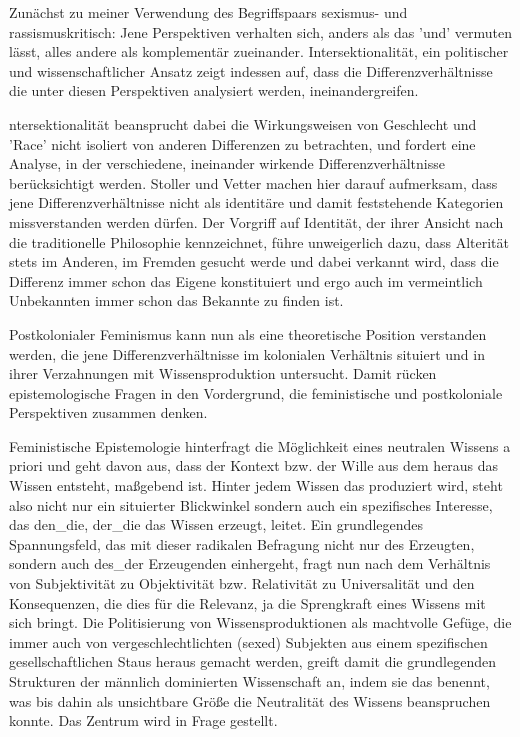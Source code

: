 Zunächst zu meiner Verwendung des Begriffspaars sexismus- und
rassismuskritisch: Jene Perspektiven verhalten sich, anders als das 'und'
vermuten lässt, alles andere als komplementär zueinander. Intersektionalität,
ein politischer und wissenschaftlicher Ansatz zeigt indessen auf, dass die
Differenzverhältnisse die unter diesen Perspektiven analysiert werden,
ineinandergreifen.

ntersektionalität beansprucht dabei die Wirkungsweisen von Geschlecht und
'Race' nicht isoliert von anderen Differenzen zu betrachten, und fordert eine
Analyse, in der verschiedene, ineinander wirkende Differenzverhältnisse
berücksichtigt werden. Stoller und Vetter machen hier darauf aufmerksam, dass
jene Differenzverhältnisse nicht als identitäre und damit feststehende
Kategorien missverstanden werden dürfen. Der Vorgriff auf Identität, der ihrer
Ansicht nach die traditionelle Philosophie kennzeichnet, führe unweigerlich
dazu, dass Alterität stets im Anderen, im Fremden gesucht werde und dabei
verkannt wird, dass die Differenz immer schon das Eigene konstituiert und ergo
auch im vermeintlich Unbekannten \glqq immer schon das Bekannte zu finden ist.\grqq
\footnotemark {}

Postkolonialer Feminismus kann nun als eine theoretische Position verstanden
werden, die jene Differenzverhältnisse im kolonialen Verhältnis situiert und in
ihrer Verzahnungen mit Wissensproduktion untersucht. Damit rücken
epistemologische Fragen in den Vordergrund, die feministische und postkoloniale
Perspektiven zusammen denken.

Feministische Epistemologie hinterfragt die Möglichkeit eines neutralen Wissens
a priori und geht davon aus, dass der Kontext bzw. der Wille aus dem heraus das
Wissen entsteht, maßgebend ist. Hinter jedem Wissen das produziert wird, steht
also nicht nur ein situierter Blickwinkel sondern auch ein spezifisches
Interesse, das den\_die, der\_die das Wissen erzeugt, leitet. Ein grundlegendes
Spannungsfeld, das mit dieser radikalen Befragung nicht nur des Erzeugten,
sondern auch des\_der Erzeugenden einhergeht, fragt nun nach dem Verhältnis von
Subjektivität zu Objektivität bzw. Relativität zu Universalität und den
Konsequenzen, die dies für die Relevanz, ja die Sprengkraft eines Wissens mit
sich bringt.\footnotemark {} 
Die Politisierung von Wissensproduktionen als machtvolle Gefüge,
die immer auch von vergeschlechtlichten (sexed) Subjekten aus einem
spezifischen gesellschaftlichen Staus heraus gemacht werden, greift damit die
grundlegenden Strukturen der männlich dominierten Wissenschaft an, indem sie
das benennt, was bis dahin als unsichtbare Größe die Neutralität des Wissens
beanspruchen konnte. Das Zentrum wird in Frage gestellt.\footnotemark
{}

